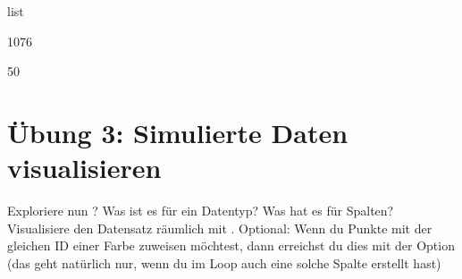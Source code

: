 \documentclass[letterpaper,10pt,english]{sphinxmanual}
\begin{document}
\begin{sphinxVerbatim}[commandchars=\\\{\}]
\end{sphinxVerbatim}

\begin{sphinxVerbatim}[commandchars=\\\{\}]
list
\end{sphinxVerbatim}

\begin{sphinxVerbatim}[commandchars=\\\{\}]
\end{sphinxVerbatim}

\begin{sphinxVerbatim}[commandchars=\\\{\}]
1076
\end{sphinxVerbatim}

\begin{sphinxVerbatim}[commandchars=\\\{\}]
\end{sphinxVerbatim}

\begin{sphinxVerbatim}[commandchars=\\\{\}]
50
\end{sphinxVerbatim}

\begin{sphinxVerbatim}[commandchars=\\\{\}]
  
\end{sphinxVerbatim}


\section{Übung 3: Simulierte Daten visualisieren}
\label{\detokenize{03_03_Zeckenstich_Simulation:ubung-3-simulierte-daten-visualisieren}}
Exploriere nun ? Was ist es für ein Datentyp? Was hat es für Spalten? Visualisiere den Datensatz räumlich mit .
Optional: Wenn du Punkte mit der gleichen ID einer Farbe zuweisen möchtest, dann erreichst du dies mit der Option  (das geht natürlich nur, wenn du im Loop auch eine solche Spalte erstellt hast)
\end{document}

